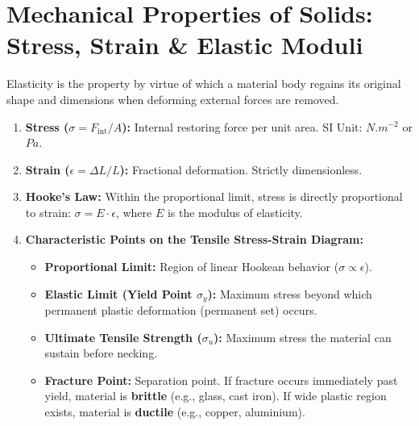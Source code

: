 \documentclass[10pt,twoside,openright]{book}
\begin{document}
\section{Mechanical Properties of Solids: Stress, Strain \& Elastic Moduli}

\begin{conceptbox}
Elasticity is the property by virtue of which a material body regains its original shape and dimensions when deforming external forces are removed.
\begin{enumerate}[leftmargin=*]
  \item \textbf{Stress ($\sigma = F_{\text{int}}/A$):} Internal restoring force per unit area. SI Unit: $\si{N.m^{-2}}$ or $\si{Pa}$.
  \item \textbf{Strain ($\epsilon = \Delta L/L$):} Fractional deformation. Strictly dimensionless.
  \item \textbf{Hooke's Law:} Within the proportional limit, stress is directly proportional to strain: $\sigma = E \cdot \epsilon$, where $E$ is the modulus of elasticity.
  \item \textbf{Characteristic Points on the Tensile Stress-Strain Diagram:}
  \begin{itemize}
    \item \textbf{Proportional Limit:} Region of linear Hookean behavior ($\sigma \propto \epsilon$).
    \item \textbf{Elastic Limit (Yield Point $\sigma_y$):} Maximum stress beyond which permanent plastic deformation (permanent set) occurs.
    \item \textbf{Ultimate Tensile Strength ($\sigma_u$):} Maximum stress the material can sustain before necking.
    \item \textbf{Fracture Point:} Separation point. If fracture occurs immediately past yield, material is \textbf{brittle} (e.g., glass, cast iron). If wide plastic region exists, material is \textbf{ductile} (e.g., copper, aluminium).
  \end{itemize}
\end{enumerate}
\end{conceptbox}
\end{document}

